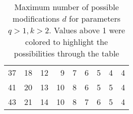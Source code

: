 \begin{table}[h]
\begin{tabular}{|r|rrrrrrrr}
37                                                & \cellcolor[HTML]{E3664E}18 & \cellcolor[HTML]{ED9573}12                       & \cellcolor[HTML]{F3AC85}9                        & \cellcolor[HTML]{F6BC91}7                        & \cellcolor[HTML]{F8C496}6                        & \cellcolor[HTML]{F9CB9C}5                        & \cellcolor[HTML]{FBD8B5}4                        & \cellcolor[HTML]{FBD8B5}4 \\ \cline{1-1}
41                                                & \cellcolor[HTML]{E05643}20 & \cellcolor[HTML]{EC8D6C}13                       & \cellcolor[HTML]{F1A47F}10                       & \cellcolor[HTML]{F4B48A}8                        & \cellcolor[HTML]{F8C496}6                        & \cellcolor[HTML]{F9CB9C}5                        & \cellcolor[HTML]{F9CB9C}5                        & \cellcolor[HTML]{FBD8B5}4 \\ \cline{1-1}
43                                                & \cellcolor[HTML]{DE4F3C}21 & \cellcolor[HTML]{EA8566}14                       & \cellcolor[HTML]{F1A47F}10                       & \cellcolor[HTML]{F4B48A}8                        & \cellcolor[HTML]{F6BC91}7                        & \cellcolor[HTML]{F8C496}6                        & \cellcolor[HTML]{F9CB9C}5                        & \cellcolor[HTML]{FBD8B5}4 \\ \cline{1-1}
\end{tabular}
\caption{Maximum number of possible modifications $d$ for parameters $q > 1, k > 2$. Values above 1 were colored to highlight the possibilities through the table}
\label{table:d-polynomial-cff-q-k}
\end{table}